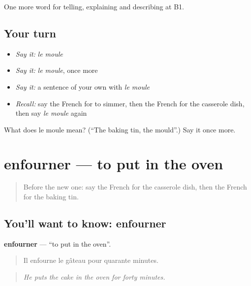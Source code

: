 \begin{grammarlens}[title={What you've built}]
One more word for telling, explaining and describing at B1.
\end{grammarlens}

\subsection*{Your turn}
\begin{itemize}
\raggedright
  \item \emph{Say it:} \emph{le moule}
  \item \emph{Say it:} \emph{le moule}, once more
  \item \emph{Say it:} a sentence of your own with \emph{le moule}
  \item \emph{Recall:} say the French for to simmer, then the French for the casserole dish, then say \emph{le moule} again
\end{itemize}

\begin{tcolorbox}[breakable,colback=teal!4,colframe=teal!35!black,title={Before you move on}]
What does le moule mean? (\textquotedblleft{}The baking tin, the mould\textquotedblright{}.) Say it once more.
\end{tcolorbox}
\section[enfourner]{enfourner — to put in the oven}

\label{lesson:FR-C331-enfourner}



\begin{quote}
Before the new one: say the French for the casserole dish, then the French for the baking tin.
\end{quote}

\subsection*{You'll want to know: enfourner}
\textbf{enfourner} — \textquotedblleft{}to put in the oven\textquotedblright{}.

\begin{quote}
Il enfourne le gâteau pour quarante minutes.
\end{quote}

\begin{quote}
\emph{He puts the cake in the oven for forty minutes.}
\end{quote}

